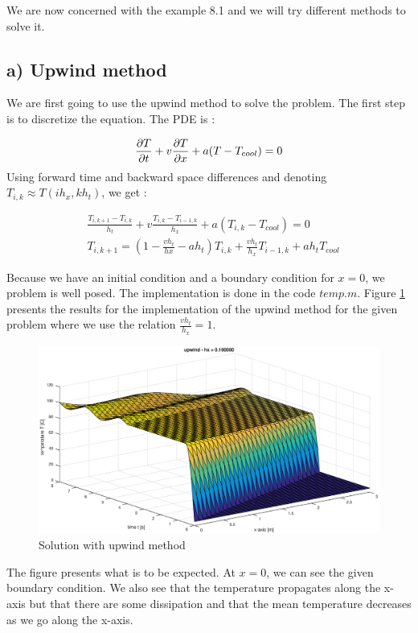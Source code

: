 We are now concerned with the example 8.1 and we will try different methods to solve it.
\subsection*{a) Upwind method} 

We are first going to use the upwind method to solve the problem. The first step is to discretize the equation. The PDE is :

$$\frac{\partial T}{\partial t}+v\frac{\partial T}{\partial x}+ a(T-T_{cool})=0$$
Using forward time and backward space differences and denoting $T_{i,k} \approx T(ih_x,kh_t)$, we get :

\begin{align*}
&\frac{T_{i,k+1}-T_{i,k}}{h_t}+v\frac{T_{i,k}-T_{i-1,k}}{h_x}+a(T_{i,k}-T_{cool})=0\\
&T_{i,k+1} = (1-\frac{vh_t}{hx}-ah_t)T_{i,k}+\frac{vh_t}{h_x}T_{i-1,k}+ah_tT_{cool}
\end{align*}

Because we have an initial condition and a boundary condition for $x=0$, we problem is well posed. The implementation is done in the code $temp.m$. Figure \ref{up} presents the results for the implementation of the upwind method for the given problem where we use the relation $\frac{vh_t}{h_x}=1$.

\begin{figure}
\begin{center}
\includegraphics[scale=0.4]{upwind.eps}
\caption{Solution with upwind method}
\label{up}
\end{center}
\end{figure}

The figure presents what is to be expected. At $x=0$, we can see the given boundary condition. We also see that the temperature propagates along the x-axis but that there are some dissipation and that the mean temperature decreases as we go along the x-axis.

